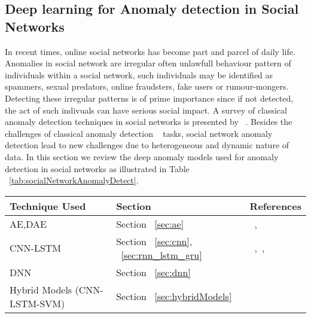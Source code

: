 \subsection{Deep learning for Anomaly detection in Social Networks}
In recent times, online social networks has become part and parcel of daily life. Anomalies in social network
are irregular often unlawfull behaviour pattern of individuals within a social network, such  individuals may be identified as  spammers, sexual predators, online fraudsters, fake users or rumour-mongers. Detecting these irregular patterns is of prime importance since if not detected, the act of such indivuals can have serious social impact. A survey of classical anomaly detection techniques in social networks is presented by ~\cite{savage2014anomaly,anand2017anomaly,yu2016survey,cao2018automatic,yu2016survey}.
Besides the challenges of classical anomaly detection ~\cite{liu2017social} tasks, social network anomaly detection lead to new challenges due to  heterogeneous and dynamic nature of data. In this section we review the deep anomaly models used for anomaly detection in social networks as illustrated in Table ~\ref{tab:socialNetworkAnomalyDetect}.

\begin{table*}
  \begin{center}
   \caption{Examples of Deep learning anomaly detection techniques used to detect anomalies in social network.
            \\CNN: Convolution Neural Networks, LSTM : Long Short Term Memory Networks
            \\AE: Autoencoders, DAE: Denoising Autoencoders
            \\SVM : Support Vector Machines., DNN : Deep Neural Network  }
    \label{tab:socialNetworkAnomalyDetect}
    \begin{tabular}{l|p{4cm}|p{5cm}}
      \textbf{Technique Used} & \textbf{Section} & \textbf{References}\\
      \hline
      AE,DAE &  Section ~\ref{sec:ae}  & ~\cite{zhang2017detecting},~\cite{castellini2017fake}\\\hline
      CNN-LSTM & Section ~\ref{sec:cnn}, ~\ref{sec:rnn_lstm_gru} & ~\cite{sun2018detecting},~\cite{shu2017doc},~\cite{yang2018anomaly}\\\hline
      DNN & Section ~\ref{sec:dnn}  & ~\cite{li2017detecting}\\\hline
      Hybrid Models (CNN-LSTM-SVM) & Section ~\ref{sec:hybridModels}  & ~\cite{wei2017new}\\\hline
    \end{tabular}
  \end{center}
\end{table*}





